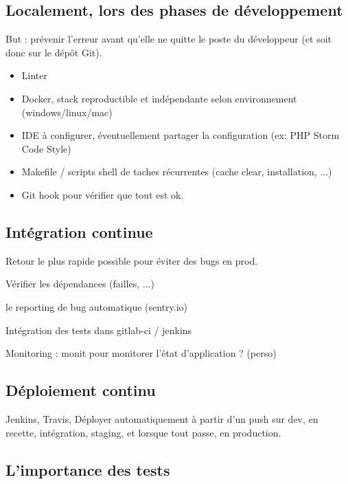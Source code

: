 \subsection{Localement, lors des phases de développement}

But : prévenir l'erreur avant qu'elle ne quitte le poste du développeur (et soit donc sur le dépôt Git).

 \begin{itemize}
 	\item Linter
 	\item Docker, stack reproductible et indépendante selon environnement (windows/linux/mac) 
 	\item IDE à configurer, éventuellement partager la configuration (ex: PHP Storm Code Style)
 	\item Makefile / scripts shell de taches récurrentes (cache clear, installation, ...)
 	\item Git hook pour vérifier que tout est ok.
 \end{itemize}

\subsection{Intégration continue}

Retour le plus rapide possible pour éviter des bugs en prod. 

Vérifier les dépendances (failles, ...)

le reporting de bug automatique (sentry.io)

Intégration des tests dans gitlab-ci / jenkins

Monitoring : monit pour monitorer l'état d'application ? (perso)

\subsection{Déploiement continu}

Jenkins, Travis, Déployer automatiquement à partir d'un push sur dev, en recette, intégration, staging, et lorsque tout passe, en production.


\subsection{L'importance des tests}

